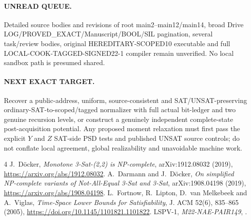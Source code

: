 \documentclass[11pt]{article}
\begin{document}
\paragraph{UNREAD QUEUE.} Detailed source bodies and revisions of root main2--main12/main14, broad Drive LOG/PROVED\_EXACT/Manuscript/BOOL/SIL pagination, several task/review bodies, original HEREDITARY-SCOPED10 executable and full LOCAL-COOK-TAGGED-SIGNED22-1 compiler remain unverified. No local sandbox path is presumed shared.

\paragraph{NEXT EXACT TARGET.} Recover a public-address, uniform, source-consistent and SAT/UNSAT-preserving ordinary-SAT-to-scoped/tagged normalizer with full actual bit-ledger and two genuine recursion levels, or construct a genuinely independent complete-state post-acquisition potential. Any proposed moment relaxation must first pass the explicit $Y$ and $Z$ SAT-side PSD tests and published UNSAT source controls; do not conflate local agreement, global realizability and unavoidable machine work.

\begin{thebibliography}{4}\small
{} J.~D\"ocker, \emph{Monotone 3-Sat-(2,2) is NP-complete}, arXiv:1912.08032 (2019), \url{https://arxiv.org/abs/1912.08032}.
 A.~Darmann and J.~D\"ocker, \emph{On simplified NP-complete variants of Not-All-Equal 3-Sat and 3-Sat}, arXiv:1908.04198 (2019), \url{https://arxiv.org/abs/1908.04198}.
 L.~Fortnow, R.~Lipton, D.~van Melkebeek and A.~Viglas, \emph{Time-Space Lower Bounds for Satisfiability}, J. ACM 52(6), 835--865 (2005), \url{https://doi.org/10.1145/1101821.1101822}.
 LSPV-1, \emph{M22-NAE-PAIR149}, .
\end{thebibliography}
\end{document}
